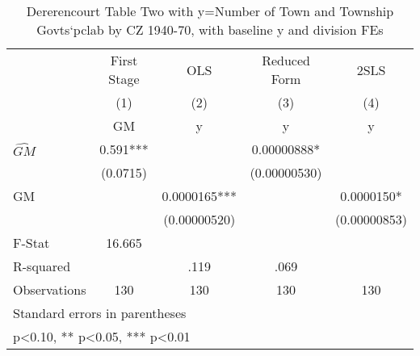 \begin{table}[htbp]\centering
\def\sym#1{\ifmmode^{#1}\else\(^{#1}\)\fi}
\caption{Dererencourt Table Two with y=Number of Town and Township Govts`pclab by CZ 1940-70, with baseline y and division FEs}
\begin{tabular}{l*{4}{c}}
\toprule
                    & First Stage   &         OLS   &Reduced Form   &        2SLS   \\
                    &\multicolumn{1}{c}{(1)}&\multicolumn{1}{c}{(2)}&\multicolumn{1}{c}{(3)}&\multicolumn{1}{c}{(4)}\\
                    &\multicolumn{1}{c}{GM}&\multicolumn{1}{c}{y}&\multicolumn{1}{c}{y}&\multicolumn{1}{c}{y}\\
\midrule
$\hat{GM}$          &       0.591***&               &  0.00000888*  &               \\
                    &    (0.0715)   &               &(0.00000530)   &               \\
\addlinespace
GM                  &               &   0.0000165***&               &   0.0000150*  \\
                    &               &(0.00000520)   &               &(0.00000853)   \\
\midrule
F-Stat              &      16.665   &               &               &               \\
R-squared           &               &        .119   &        .069   &               \\
Observations        &         130   &         130   &         130   &         130   \\
\bottomrule
\multicolumn{5}{l}{\footnotesize Standard errors in parentheses}\\
\multicolumn{5}{l}{\footnotesize * p<0.10, ** p<0.05, *** p<0.01}\\
\end{tabular}
\end{table}
